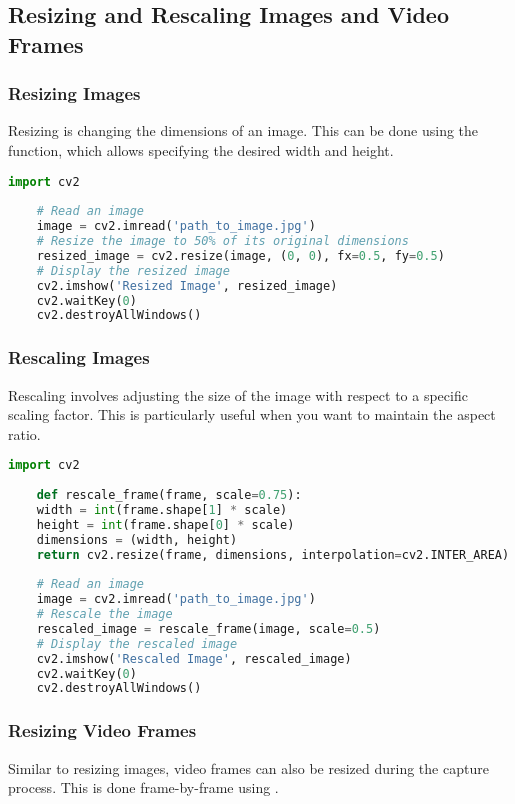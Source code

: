 \subsection{Resizing and Rescaling Images and Video Frames}
\subsubsection{Resizing Images}
Resizing is changing the dimensions of an image. This can be done using the  function, which allows specifying the desired width and height.

\begin{lstlisting}[language=Python]
	import cv2
	
	# Read an image
	image = cv2.imread('path_to_image.jpg')
	# Resize the image to 50% of its original dimensions
	resized_image = cv2.resize(image, (0, 0), fx=0.5, fy=0.5)
	# Display the resized image
	cv2.imshow('Resized Image', resized_image)
	cv2.waitKey(0)
	cv2.destroyAllWindows()
\end{lstlisting}

\subsubsection{Rescaling Images}
Rescaling involves adjusting the size of the image with respect to a specific scaling factor. This is particularly useful when you want to maintain the aspect ratio.\cite{Jasmcaus:2024}

\begin{lstlisting}[language=Python]
	import cv2
	
	def rescale_frame(frame, scale=0.75):
	width = int(frame.shape[1] * scale)
	height = int(frame.shape[0] * scale)
	dimensions = (width, height)
	return cv2.resize(frame, dimensions, interpolation=cv2.INTER_AREA)
	
	# Read an image
	image = cv2.imread('path_to_image.jpg')
	# Rescale the image
	rescaled_image = rescale_frame(image, scale=0.5)
	# Display the rescaled image
	cv2.imshow('Rescaled Image', rescaled_image)
	cv2.waitKey(0)
	cv2.destroyAllWindows()
\end{lstlisting}

\subsubsection{Resizing Video Frames}
Similar to resizing images, video frames can also be resized during the capture process. This is done frame-by-frame using .\cite{Jasmcaus:2024}

